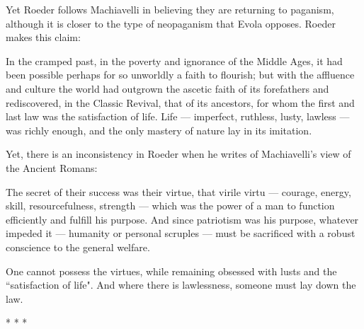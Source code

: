 Yet Roeder follows Machiavelli in believing they are returning to paganism, although it is closer to the type of neopaganism that Evola opposes. Roeder makes this claim:

\begin{quotex}
In the cramped past, in the poverty and ignorance of the Middle Ages, it had been possible perhaps for so unworldly a faith to flourish; but with the affluence and culture the world had outgrown the ascetic faith of its forefathers and rediscovered, in the Classic Revival, that of its ancestors, for whom the first and last law was the satisfaction of life. Life — imperfect, ruthless, lusty, lawless — was richly enough, and the only mastery of nature lay in its imitation.

\end{quotex}
Yet, there is an inconsistency in Roeder when he writes of Machiavelli's view of the Ancient Romans:

\begin{quotex}
The secret of their success was their virtue, that virile virtu — courage, energy, skill, resourcefulness, strength — which was the power of a man to function efficiently and fulfill his purpose. And since patriotism was his purpose, whatever impeded it — humanity or personal scruples — must be sacrificed with a robust conscience to the general welfare.

\end{quotex}
One cannot possess the virtues, while remaining obsessed with lusts and the ``satisfaction of life". And where there is lawlessness, someone must lay down the law.




\begin{center}* * *\end{center}

